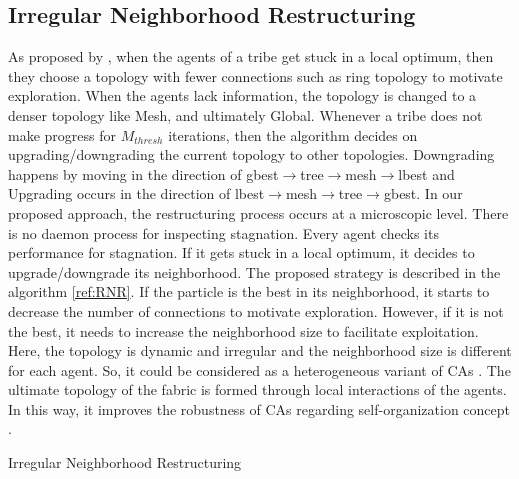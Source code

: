 \documentclass[letterpaper]{article}
\begin{document}
\subsection{Irregular Neighborhood Restructuring}
As proposed by \cite{ali2016leveraged}, when the agents of a tribe get stuck in a local optimum, then they choose a topology with fewer connections such as ring topology to motivate exploration. When the agents lack information, the topology is changed to a denser topology like Mesh, and ultimately Global. Whenever a tribe does not make progress for $M_{thresh}$ iterations, then the algorithm decides on upgrading/downgrading the current topology to other topologies. Downgrading happens by moving in the direction of gbest$\rightarrow$tree$\rightarrow$mesh$\rightarrow$lbest and Upgrading occurs in the direction of lbest$\rightarrow$mesh$\rightarrow$tree$\rightarrow$gbest. In our proposed approach, the restructuring process occurs at a microscopic level. There is no daemon process for inspecting stagnation. Every agent checks its performance for stagnation. If it gets stuck in a local optimum, it decides to upgrade/downgrade its neighborhood. The proposed strategy is described in the algorithm \ref{ref:RNR}. If the particle is the best in its neighborhood, it starts to decrease the number of connections to motivate exploration. However, if it is not the best, it needs to increase the neighborhood size to facilitate exploitation. Here, the topology is dynamic and irregular and the neighborhood size is different for each agent. So, it could be considered as a heterogeneous variant of CAs \cite{de2009heterogeneous}. The ultimate topology of the fabric is formed through local interactions of the agents. In this way, it improves the robustness of CAs regarding self-organization concept \cite{kennedy2001swarm}. 
\begin{algorithm}{	}
			\caption{Irregular Neighborhood Restructuring}			
		\label{ref:RNR}
\end{algorithm}
\end{document}
